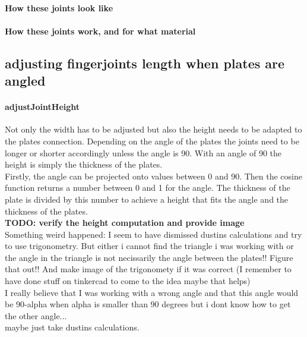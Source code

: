 \documentclass[../ClassicThesis.tex]{subfiles}
\begin{document}
    \paragraph{How these joints look like}
    \paragraph{How these joints work, and for what material}

\subsection{adjusting fingerjoints length when plates are angled}
    \paragraph{adjustJointHeight}
    Not only the width has to be adjusted but also the height needs to be adapted to the plates connection. Depending on the angle of the plates the joints need to be longer or shorter accordingly unless the angle is 90. With an angle of 90 the height is simply the thickness of the plates. \\
    Firstly, the angle can be projected onto values between 0 and 90. Then the cosine function returns a number between 0 and 1 for the angle. The thickness of the plate is divided by this number to achieve a height that fits the angle and the thickness of the plates. \\
    \textbf{TODO: verify the height computation and provide image}\\
    Something weird happened: I seem to have dismissed dustins calculations and try to use trigonometry. But either i cannot find the triangle i was working with or the angle in the triangle is not necissarily the angle between the plates!! Figure that out!! And make image of the trigonomety if it was correct (I remember to have done stuff on tinkercad to come to the idea maybe that helps)\\
    I really believe that I was working with a wrong angle and that this angle would be 90-alpha when alpha is smaller than 90 degrees but i dont know how to get the other angle...\\ maybe just take dustins calculations.
\end{document}
